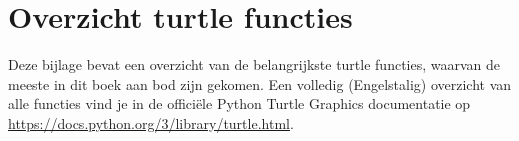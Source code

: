 \documentclass[../main]{subfiles}
\begin{document}
\graphicspath{{images/}}
%     

\newlength{}
{}

\pagestyle{mypagestyle}

\chapter{Overzicht turtle functies}%
\label{chap:overzicht-turtle-functies}
Deze bijlage bevat een overzicht van de belangrijkste turtle functies, waarvan de meeste in dit boek aan bod zijn gekomen. Een volledig (Engelstalig) overzicht van alle functies vind je in de officiële Python Turtle Graphics documentatie op \url{https://docs.python.org/3/library/turtle.html}.
\end{document}
